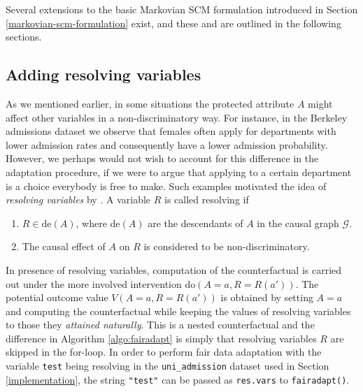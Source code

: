 \documentclass[
  nojss]{jss}
\providecommand{\tightlist}{%
  \setlength{\itemsep}{0pt}\setlength{\parskip}{0pt}}
\begin{document}
Several extensions to the basic Markovian SCM formulation introduced in
Section \ref{markovian-scm-formulation} exist, and these and are
outlined in the following sections.

\hypertarget{sec:resolvers}{%
\subsection{Adding resolving variables}\label{sec:resolvers}}

As we mentioned earlier, in some situations the protected attribute
\(A\) might affect other variables in a non-discriminatory way. For
instance, in the Berkeley admissions dataset \citep{bickel1975sex} we
observe that females often apply for departments with lower admission
rates and consequently have a lower admission probability. However, we
perhaps would not wish to account for this difference in the adaptation
procedure, if we were to argue that applying to a certain department is
a choice everybody is free to make. Such examples motivated the idea of
\emph{resolving variables} by \citet{kilbertus2017avoiding}. A variable
\(R\) is called resolving if

\begin{enumerate}
\def\labelenumi{(\roman{enumi})}
\tightlist
\item
  \(R \in \mathrm{de}(A)\), where \(\mathrm{de}(A)\) are the descendants
  of \(A\) in the causal graph \(\mathcal{G}\).
\item
  The causal effect of \(A\) on \(R\) is considered to be
  non-discriminatory.
\end{enumerate}

In presence of resolving variables, computation of the counterfactual is
carried out under the more involved intervention
do\((A = a, R = R(a'))\). The potential outcome value
\(V(A = a, R = R(a'))\) is obtained by setting \(A = a\) and computing
the counterfactual while keeping the values of resolving variables to
those they \emph{attained naturally}. This is a nested counterfactual
and the difference in Algorithm \ref{algo:fairadapt} is simply that
resolving variables \(R\) are skipped in the for-loop. In order to
perform fair data adaptation with the variable \texttt{test} being
resolving in the \texttt{uni\_admission} dataset used in Section
\ref{implementation}, the string \texttt{"test"} can be passed as
\texttt{res.vars} to \texttt{fairadapt()}.
\end{document}
